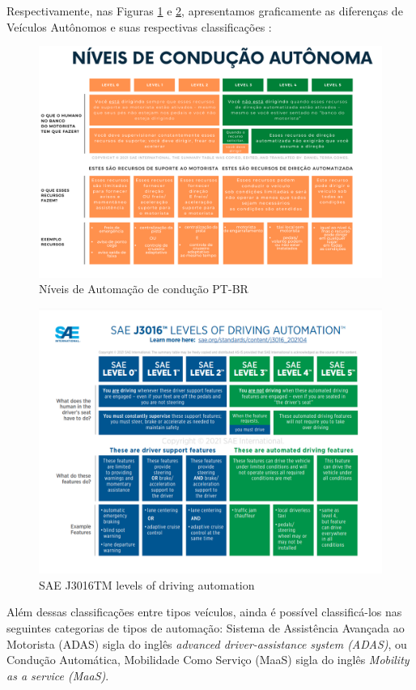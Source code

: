 Respectivamente, nas Figuras \ref{Graph_PT} e \ref{Graph_EN}, apresentamos graficamente as diferenças de Veículos Autônomos e suas respectivas classificações \cite{SAE}:
\begin{figure}[H]
\centering
\includegraphics[width=15cm]{Figures/IC-Graph1.png}
\caption{Níveis de Automação de condução PT-BR}
\label{Graph_PT}
\end{figure}

\begin{figure}[H]
\centering
\includegraphics[width=15cm]{Figures/IC-GrapEN.png}
\caption{SAE J3016TM levels of driving automation \cite{SAE}}
\label{Graph_EN}
\end{figure}

Além dessas classificações entre tipos veículos, ainda é possível classificá-los nas seguintes categorias de tipos de automação: Sistema de Assistência Avançada ao Motorista (ADAS) sigla do inglês \textit{advanced driver-assistance system (ADAS)}, ou Condução Automática, Mobilidade Como Serviço (MaaS) sigla do inglês \textit{Mobility as a service (MaaS)}.

